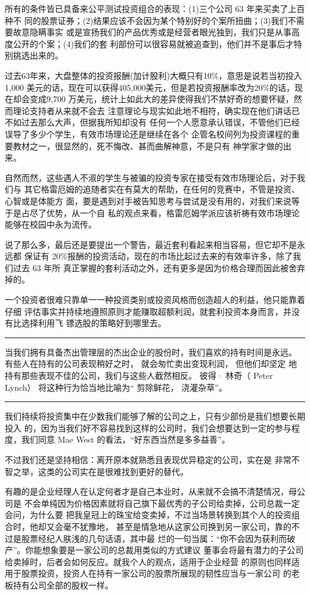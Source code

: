 \documentclass[UTF8,a4paper,zihao=-4,fontset = windows]{ctexart} %
\begin{document}
所有的条件皆已具备来公平测试投资组合的表现：(1)三个公司 63 年来买卖了上百种不
同的股票证券；(2)结果应该不会因为某个特别好的个案所扭曲；(3)我们不需要故意隐瞒事实
或是宣扬我们的产品优秀或是经营者眼光独到，我们只是从事高度公开的个案；(4)我们的套
利部份可以很容易就被追查到，他们并不是事后才特别挑选出来的。

过去63年来，大盘整体的投资报酬(加计股利)大概只有10\%，意思是说若当初投入1,000
美元的话，现在可以获得405,000美元，但是若投资报酬率改为20\%的话，现在却会变成9,700
万美元，统计上如此大的差异使得我们不禁好奇的想要怀疑，然而理论支持者从来就不会去
注意理论与现实如此地不相符，确实现在他们讲话已不如过去那么大声，但据我所知却没有
任何一个人愿意承认错误，不管他们已经误导了多少个学生，有效市场理论还是继续在各个
企管名校间列为投资课程的重要教材之一，很显然的，死不悔改、甚而曲解神意，不是只有
神学家才做的出来。

自然而然，这些遇人不淑的学生与被骗的投资专家在接受有效市场理论后，对于我们与
其它格雷厄姆的追随者实在有莫大的帮助，在任何的竞赛中，不管是投资、心智或是体能方
面，要是遇到对手被告知思考与尝试是没有用的，对我们来说等于是占尽了优势，从一个自
私的观点来看，格雷厄姆学派应该祈祷有效市场理论能够在校园中永为流传。

说了那么多，最后还是要提出一个警告，最近套利看起来相当容易，但它却不是永远都
保证有 20\%报酬的投资活动，现在的市场比起过去来的有效率许多，除了我们过去 63 年所
真正掌握的套利活动之外，还有更多是因为价格合理而因此被舍弃掉的。

一个投资者很难只靠单一一种投资类别或投资风格而创造超人的利益，他只能靠着仔细
评估事实并持续地遵照原则才能赚取超额利润，就套利投资本身而言，并没有比选择利用飞
镖选股的策略好到哪里去。

\rule{10cm}{0.4pt} %

当我们拥有具备杰出管理层的杰出企业的股份时，我们喜欢的持有时间是永远。 有些人在持有的公司表现稍好之时， 就会匆忙卖出变现利润， 但他们却坚定 地 持有那些表现不佳的公司，我们与这些人截然相反。 彼得· 林奇（ Peter Lynch） 将这种行为恰当地比喻为“ 剪除鲜花， 浇灌杂草”。

\rule{10cm}{0.4pt}

我们持续将投资集中在少数我们能够了解的公司之上，只有少部份是我们想要长期投入
的，因为当我们好不容易找到这样的公司时，我们会想要达到一定的参与程度，我们同意
Mae West 的看法，“好东西当然是多多益善”。

不过我们还是坚持相信：离开原本就熟悉且表现优异稳定的公司，实在是
非常不智之举，这类的公司实在是很难找到更好的替代。

有趣的是企业经理人在认定何者才是自己本业时，从来就不会搞不清楚情况，母公司是
不会单纯因为价格因素就将自己旗下最优秀的子公司给卖掉，公司总裁一定会问，为什么要
把我皇冠上的珠宝给变卖掉，不过当场景转换到其个人的投资组合时，他却又会毫不犹豫地，
甚至是情急地从这家公司换到另一家公司，靠的不过是股票经纪人肤浅的几句话语，其中最
烂的一句当属：“你不会因为获利而破产”。你能想象要是一家公司的总裁用类似的方式建议
董事会将最有潜力的子公司给卖掉时，后者会如何反应。就我个人的观点，适用于企业经营
的原则也同样适用于股票投资，投资人在持有一家公司的股票所展现的韧性应当与一家公司
的老板持有公司全部的股权一样。
\end{document}
